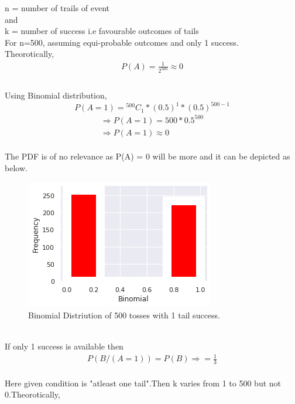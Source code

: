 \documentclass[journal,12pt,twocolumn]{IEEEtran}
\begin{document}
n = number of trails of event\\ and\\
k = number of success i.e favourable outcomes of tails\\
For n=500, assuming equi-probable outcomes and only 1 success.\\
Theorotically,
\begin{align*}
P(A)=\frac{1}{2^{500}}\approx 0\\
\end{align*}
\\Using Binomial distribution,
\begin{equation}
P(A=1)= { }^{500}C_{1}*(0.5)^{1}*(0.5)^{500-1}
\end{equation}
\begin{align*}
\Rightarrow P(A=1) = 500 * 0.5^{500}\\
\Rightarrow P(A=1) \approx 0
\end{align*}
\\The PDF is of no relevance as P(A) = 0 will be more and it can be depicted as below.
\begin{figure}
	\includegraphics[width=\linewidth]{Binomial_1_success.png}
  \caption{Binomial Distriution of 500 tosses with 1 tail success.}
  \label{fig:Fig1}
\end{figure}
\\If only 1 success is available then
\begin{align*} 
P(B/(A=1))=P(B)
\Rightarrow =\frac{1}{3}
\end{align*}\\
Here given condition is "atleast one tail".Then k varies from 1 to 500 but not 0.Theorotically,\\
\end{document}
